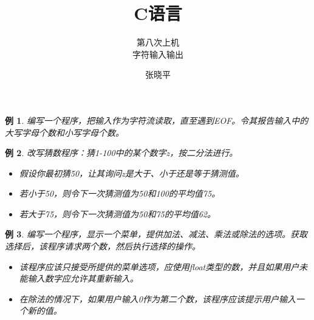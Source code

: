\documentclass[12pt,notheorems]{beamer}
\newtheorem{li}{例}
\begin{document}
\title{C语言}
\subtitle{第八次上机\\ 字符输入输出}
\author{张晓平}


\begin{frame}[plain]\transboxout
\titlepage
\end{frame}




\begin{frame}[fragile]
\begin{li}
编写一个程序，把输入作为字符流读取，直至遇到EOF。令其报告输入中的大写字母个数和小写字母个数。
\end{li}
\end{frame}

\begin{frame}[fragile]
\begin{li}
改写猜数程序：猜1-100中的某个数字z，按二分法进行。
\begin{itemize}
\item 
假设你最初猜50，让其询问z是大于、小于还是等于猜测值。
\item
若小于50，则令下一次猜测值为50和100的平均值75。
\item
若大于75，则令下一次猜测值为50和75的平均值62。
\end{itemize}
\end{li}
\end{frame}

\begin{frame}[fragile]
\begin{li}
编写一个程序，显示一个菜单，提供加法、减法、乘法或除法的选项。获取选择后，该程序请求两个数，然后执行选择的操作。
\begin{itemize}
\item 
该程序应该只接受所提供的菜单选项，应使用float类型的数，并且如果用户未能输入数字应允许其重新输入。
\item
在除法的情况下，如果用户输入0作为第二个数，该程序应该提示用户输入一个新的值。
\end{itemize}
\end{li}
\end{frame}
\end{document}
